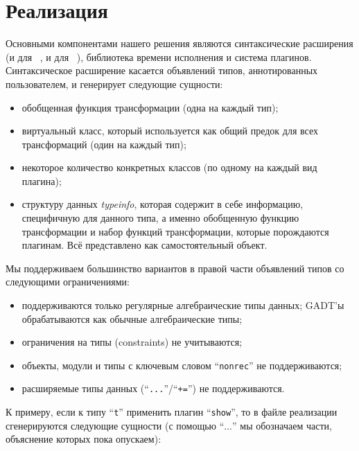 \section{Реализация}
\label{sec:implementation}

Основными компонентами нашего решения являются синтаксические расширения (и для ~\cite{Camlp5}, и для  ~\cite{PPXLib}), библиотека времени исполнения и система плагинов. Синтаксическое расширение касается объявлений типов, аннотированных пользователем, и генерирует следующие сущности:


\begin{itemize}
\item обобщенная функция трансформации (одна на каждый тип);
\item виртуальный класс, который используется как общий предок для всех трансформаций (один на каждый тип);
\item некоторое количество конкретных классов (по одному на каждый вид плагина);
\item структуру данных \emph{typeinfo}, которая содержит в себе информацию, специфичную для данного типа, а именно обобщенную функцию трансформации и набор функций трансформации, которые порождаются плагинам. Всё представлено как самостоятельный объект.
\end{itemize}

Мы поддерживаем большинство вариантов в правой части объявлений типов со следующими ограничениями:

\begin{itemize}
\item поддерживаются только регулярные алгебраические типы данных; GADT'ы обрабатываются как обычные алгебраические типы;
\item ограничения на типы (constraints) не учитываются;
\item объекты, модули и типы с ключевым словом ``\lstinline{nonrec}'' не поддерживаются;
\item расширяемые типы данных (``\lstinline{...}''/``\lstinline{+=}'') не поддерживаются.
\end{itemize}

К примеру, если к типу ``\lstinline{t}'' применить плагин ``\lstinline{show}'', то в файле реализации сгенерируются следующие сущности (с помощью ``$\dots$'' мы обозначаем части, объяснение которых пока опускаем):

